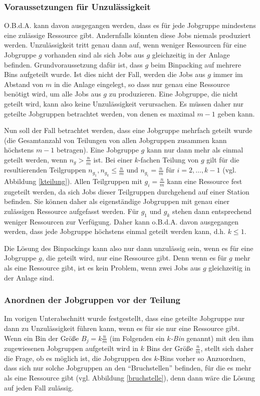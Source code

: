 \documentclass{scrreprt}
\begin{document}
\subsubsection{Voraussetzungen für Unzulässigkeit}
O.B.d.A. kann davon ausgegangen werden, dass es für jede Jobgruppe mindestens eine zulässige Ressource gibt.
Andernfalls könnten diese Jobs niemals produziert werden.
Unzulässigkeit tritt genau dann auf, wenn weniger Ressourcen für eine Jobgruppe $g$ vorhanden sind als sich Jobs aus $g$ gleichzeitig in der Anlage befinden.
Grundvoraussetzung dafür ist, dass $g$ beim Binpacking auf mehrere Bins aufgeteilt wurde.
Ist dies nicht der Fall, werden die Jobs aus $g$ immer im Abstand von $m$ in die Anlage eingelegt,
so dass nur genau eine Ressource benötigt wird, um alle Jobs aus $g$ zu produzieren.
Eine Jobgruppe, die nicht geteilt wird, kann also keine Unzulässigkeit verursachen.
Es müssen daher nur geteilte Jobgruppen betrachtet werden, von denen es maximal $m-1$ geben kann.

Nun soll der Fall betrachtet werden, dass eine Jobgruppe mehrfach geteilt wurde 
(die Gesamtanzahl von Teilungen von allen Jobgruppen zusammen kann höchstens $m-1$ betragen).
Eine Jobgruppe $g$ kann nur dann mehr als einmal geteilt werden, wenn $n_g > \frac{n}{m}$ ist.
Bei einer $k$-fachen Teilung von $g$ gilt für die resultierenden Teilgruppen $n_{g_1},n_{g_k}\leq\frac{n}{m}$ und $n_{g_i}=\frac{n}{m}$ für $i=2,\ldots,k-1$
(vgl. Abbildung \ref{kteilung}).
Allen Teilgruppen mit $g_i=\frac{n}{m}$ kann eine Ressource fest zugeteilt werden, da sich Jobs dieser Teilgruppen durchgehend auf einer Station befinden.
Sie können daher als eigenständige Jobgruppen mit genau einer zulässigen Ressource aufgefasst werden.
Für $g_1$ und $g_k$ stehen dann entsprechend weniger Ressourcen zur Verfügung.
Daher kann o.B.d.A. davon ausgegangen werden, dass jede Jobgruppe höchstens einmal geteilt werden kann, d.h. $k\leq 1$.

Die Lösung des Binpackings kann also nur dann unzulässig sein, wenn es für eine Jobgruppe $g$, die geteilt wird, nur eine Ressource gibt.
Denn wenn es für $g$ mehr als eine Ressource gibt, ist es kein Problem, wenn zwei Jobs aus $g$ gleichzeitig in der Anlage sind.

\subsubsection{Anordnen der Jobgruppen vor der Teilung}
Im vorigen Unterabschnitt wurde festgestellt, dass eine geteilte Jobgruppe nur dann
zu Unzulässigkeit führen kann, wenn es für sie nur eine Ressource gibt.
Wenn ein Bin der Größe $B_j = k\frac{n}{m}$ (im Folgenden ein $k$\textit{-Bin} genannt) 
mit den ihm zugewiesenen Jobgruppen aufgeteilt wird in $k$ Bins der Größe $\frac{n}{m}$, 
stellt sich daher die Frage, ob es möglich ist, die Jobgruppen des $k$-Bins vorher so Anzuordnen, dass sich nur solche Jobgruppen an den "`Bruchstellen"' befinden, 
für die es mehr als eine Ressource gibt (vgl. Abbildung \ref{bruchstelle}), denn dann wäre die Lösung auf jeden Fall zulässig.
\end{document}
